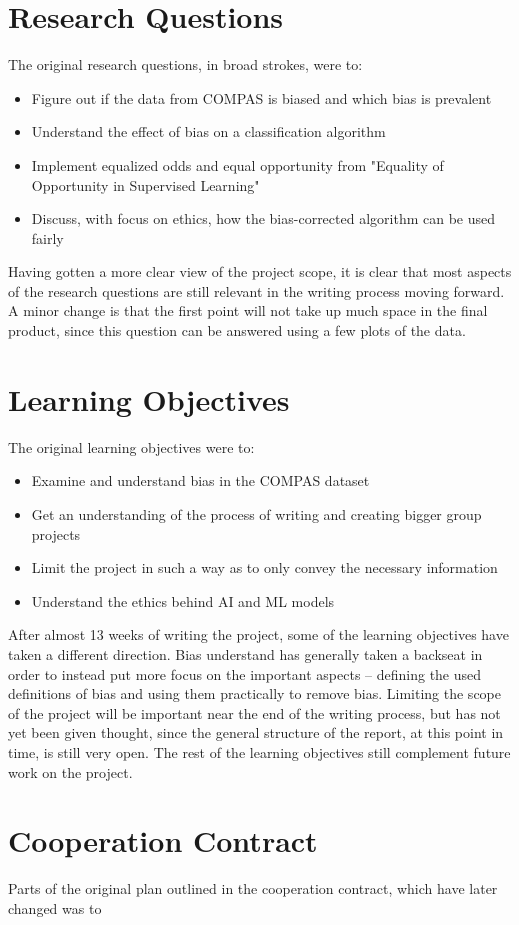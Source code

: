 \documentclass[11pt, fleqn]{article}
\begin{document}
	\section*{Research Questions}
	The original research questions, in broad strokes, were to:
	\begin{itemize}
		\itemsep-0.1cm
		\item Figure out if the data from COMPAS is biased and which bias is prevalent
		
		\item Understand the effect of bias on a classification algorithm
		
		\item Implement equalized odds and equal opportunity from "Equality of Opportunity in Supervised Learning"
		
		\item Discuss, with focus on ethics, how the bias-corrected algorithm can be used fairly
	\end{itemize}
	
	Having gotten a more clear view of the project scope, it is clear that most aspects of the research questions are still relevant in the writing process moving forward. A minor change is that the first point will not take up much space in the final product, since this question can be answered using a few plots of the data.
	
	\section*{Learning Objectives}
	The original learning objectives were to:
	\begin{itemize}
		\itemsep-0.1cm
		\item Examine and understand bias in the COMPAS dataset
		\item Get an understanding of the process of writing and creating bigger group projects
		\item Limit the project in such a way as to only convey the necessary information
		\item Understand the ethics behind AI and ML models
	\end{itemize}
	
	After almost 13 weeks of writing the project, some of the learning objectives have taken a different direction. Bias understand has generally taken a backseat in order to instead put more focus on the important aspects – defining the used definitions of bias and using them practically to remove bias. Limiting the scope of the project will be important near the end of the writing process, but has not yet been given thought, since the general structure of the report, at this point in time, is still very open. The rest of the learning objectives still complement future work on the project.
	
	\section*{Cooperation Contract}
	Parts of the original plan outlined in the cooperation contract, which have later changed was to
	
	
\end{document}
